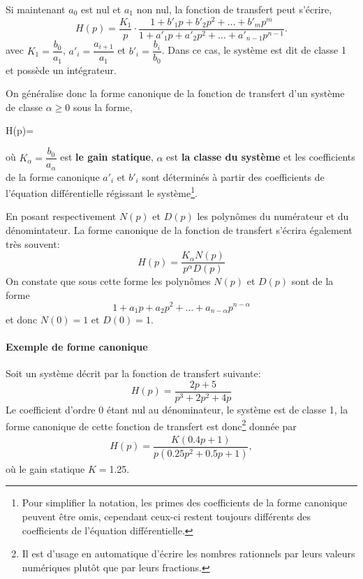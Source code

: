 Si maintenant $a_0$ est nul et $a_1$ non nul, la fonction de transfert 
peut s'écrire,
$$
H(p)=\dfrac{K_1}{p}
\cdot
\dfrac{1+b'_1p+b'_2p^2+\ldots+b'_mp^m}{1+a'_1p+a'_2p^2+\ldots+a'_{n-1}p^{n-1}}.
$$
avec $K_1=\dfrac{b_0}{a_1}$, $a'_i=\dfrac{a_{i+1}}{a_1}$ et 
$b'_i=\dfrac{b_i}{b_0}$. Dans ce cas, le système est dit de classe 1 
et possède un intégrateur.

On généralise donc la forme canonique de la fonction de transfert d'un 
système de classe $\alpha\ge0$ sous la forme, 
\begin{bequation}
H(p)=
\cdot
{} 
\label{eq-ftcan} 
\end{bequation}
où $K_\alpha=\dfrac{b_0}{a_\alpha}$ est \textbf{le gain statique}, 
$\alpha$ est \textbf{la classe du système} et les coefficients de la forme 
canonique $a'_i$ et $b'_i$ sont déterminés à partir des coefficients 
de l'équation différentielle régissant le système\footnote{Pour simplifier 
la notation, les primes des coefficients de la forme canonique peuvent 
être omis, cependant ceux-ci restent toujours différents des coefficients 
de l'équation différentielle.}.

En posant respectivement $N(p)$ et $D(p)$ les polynômes du numérateur 
et du dénomintateur. La forme canonique de la fonction de transfert 
s'écrira également très souvent:
$$
H(p)=\dfrac{K_\alpha N(p)}{p^\alpha D(p)}
$$
On constate que sous cette forme les polynômes $N(p)$ et $D(p)$ sont 
de la forme 
$$
1+a_1p+a_2p^2+\ldots+a_{n-\alpha}p^{n-\alpha}
$$
et donc $N(0)=1$ et $D(0)=1$.
\paragraph{Exemple de forme canonique}
Soit un système décrit par la fonction de transfert suivante:
$$
H(p)=\dfrac{2p+5}{p^3+2p^2+4p}
$$
Le coefficient d'ordre 0 étant nul au dénominateur, le système est de classe 1, 
la forme canonique de cette fonction de transfert est 
donc\footnote{Il est d'usage en automatique d'écrire les nombres rationnels 
par leurs valeurs numériques plutôt que par leurs fractions. } donnée par
\begin{align*}
H(p)=\dfrac{K(0.4p+1)}{p(0.25p^2+0.5p+1)},
\end{align*}
où le gain statique $K=$1.25.

